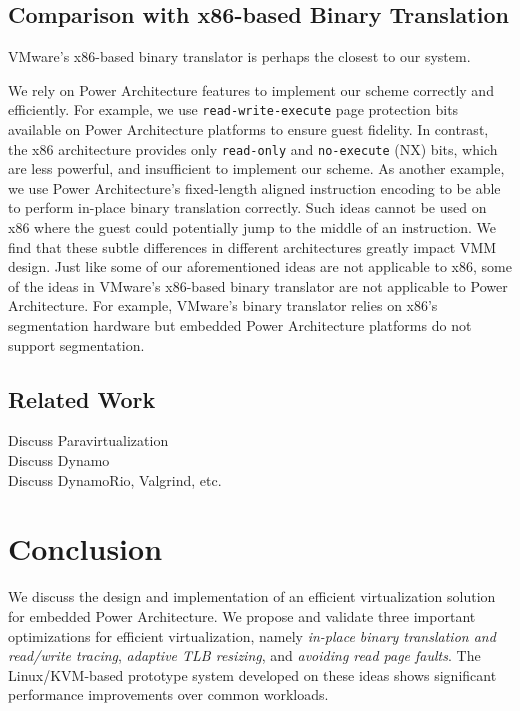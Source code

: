 \documentclass[10pt,twocolumn]{article}
\begin{document}
\subsection{Comparison with x86-based Binary Translation}
VMware's x86-based binary translator\cite{agesen:comparison} is perhaps the closest
to our system.

We rely on Power Architecture features to implement our
scheme correctly and efficiently. For example, we use
{\tt read-write-execute} page protection bits available on Power Architecture platforms to ensure guest
fidelity. In contrast, the x86 architecture provides only {\tt read-only} and
{\tt no-execute} (NX) bits, which are less powerful, and insufficient
to implement our scheme. As another
example, we use Power
Architecture's fixed-length aligned instruction encoding to be able to
perform in-place binary translation correctly. Such ideas cannot be used
on x86 where the guest could potentially jump to the middle of an instruction.
We find that these subtle
differences in different architectures greatly impact VMM design. Just like some
of our aforementioned ideas are not applicable to
x86, some of the ideas in VMware's x86-based binary translator
are not applicable to Power Architecture. For example, VMware's binary translator
relies on x86's segmentation hardware but embedded Power Architecture platforms do not
support segmentation.

\subsection{Related Work}
Discuss Paravirtualization\\
Discuss Dynamo\\
Discuss DynamoRio, Valgrind, etc.\\
\section{Conclusion}
We discuss the design and implementation of an efficient virtualization solution
for embedded Power Architecture. We propose and validate three important optimizations
for efficient virtualization, namely {\em in-place binary translation and read/write
tracing}, {\em adaptive TLB resizing}, and {\em avoiding read page faults}. 
The Linux/KVM-based prototype system developed on these ideas shows significant
performance improvements over common workloads.


\end{document}
